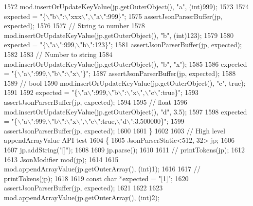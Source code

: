 \begin{DoxyCode}
{{{{{{{{{{{{{{{{{{{{{1572         mod.insertOrUpdateKeyValue(jp.getOuterObject(), \textcolor{stringliteral}{"a"}, (int)999);
1573 
1574         expected = \textcolor{stringliteral}{"\{\(\backslash\)"b\(\backslash\)":\(\backslash\)"xxx\(\backslash\)",\(\backslash\)"a\(\backslash\)":999\}"};
1575         assertJsonParserBuffer(jp, expected);
1576 
1577         \textcolor{comment}{// String to number}
1578         mod.insertOrUpdateKeyValue(jp.getOuterObject(), \textcolor{stringliteral}{"b"}, (int)123);
1579 
1580         expected = \textcolor{stringliteral}{"\{\(\backslash\)"a\(\backslash\)":999,\(\backslash\)"b\(\backslash\)":123\}"};
1581         assertJsonParserBuffer(jp, expected);
1582 
1583         \textcolor{comment}{// Number to string}
1584         mod.insertOrUpdateKeyValue(jp.getOuterObject(), \textcolor{stringliteral}{"b"}, \textcolor{stringliteral}{"x"});
1585 
1586         expected = \textcolor{stringliteral}{"\{\(\backslash\)"a\(\backslash\)":999,\(\backslash\)"b\(\backslash\)":\(\backslash\)"x\(\backslash\)"\}"};
1587         assertJsonParserBuffer(jp, expected);
1588 
1589         \textcolor{comment}{// bool}
1590         mod.insertOrUpdateKeyValue(jp.getOuterObject(), \textcolor{stringliteral}{"c"}, \textcolor{keyword}{true});
1591 
1592         expected = \textcolor{stringliteral}{"\{\(\backslash\)"a\(\backslash\)":999,\(\backslash\)"b\(\backslash\)":\(\backslash\)"x\(\backslash\)",\(\backslash\)"c\(\backslash\)":true\}"};
1593         assertJsonParserBuffer(jp, expected);
1594 
1595         \textcolor{comment}{// float}
1596         mod.insertOrUpdateKeyValue(jp.getOuterObject(), \textcolor{stringliteral}{"d"}, 3.5);
1597 
1598         expected = \textcolor{stringliteral}{"\{\(\backslash\)"a\(\backslash\)":999,\(\backslash\)"b\(\backslash\)":\(\backslash\)"x\(\backslash\)",\(\backslash\)"c\(\backslash\)":true,\(\backslash\)"d\(\backslash\)":3.500000\}"};
1599         assertJsonParserBuffer(jp, expected);
1600 
1601     \}
1602 
1603     \textcolor{comment}{// High level appendArrayValue API test}
1604     \{
1605         JsonParserStatic<512, 32> jp;
1606 
1607         jp.addString(\textcolor{stringliteral}{"[]"});
1608 
1609         jp.parse();
1610 
1611         \textcolor{comment}{// printTokens(jp);}
1612 
1613         JsonModifier mod(jp);
1614 
1615         mod.appendArrayValue(jp.getOuterArray(), (int)1);
1616 
1617         \textcolor{comment}{// printTokens(jp);}
1618 
1619         \textcolor{keyword}{const} \textcolor{keywordtype}{char} *expected = \textcolor{stringliteral}{"[1]"};
1620         assertJsonParserBuffer(jp, expected);
1621 
1622 
1623         mod.appendArrayValue(jp.getOuterArray(), (int)2);
}}}}}}}}}}}}}}}}}}}}}
\end{DoxyCode}
